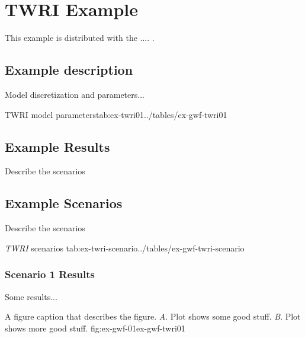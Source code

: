 \section{\mf TWRI Example}

This example is distributed with the \mff .... \citep{modflow2005}.

\subsection{Example description}

Model discretization and parameters...





\begin{StandardTable}{TWRI model parameters}{tab:ex-twri01}{../tables/ex-gwf-twri01}
\end{StandardTable}

\subsection{Example Results}

Describe the scenarios

\subsection{Example Scenarios}

Describe the scenarios

\begin{ScenarioTable}{
                                   \textit{TWRI} scenarios
                                   }{tab:ex-twri-scenario}{../tables/ex-gwf-twri-scenario}
\end{ScenarioTable}


\subsubsection{Scenario 1 Results}

Some results...

\begin{StandardFigure}{
                                     A figure caption that describes the figure. 
                                     \textit{A}. Plot shows some good stuff.
                                     \textit{B}. Plot shows more good stuff.
                                     }{fig:ex-gwf-01}{ex-gwf-twri01}
\end{StandardFigure}                                 


